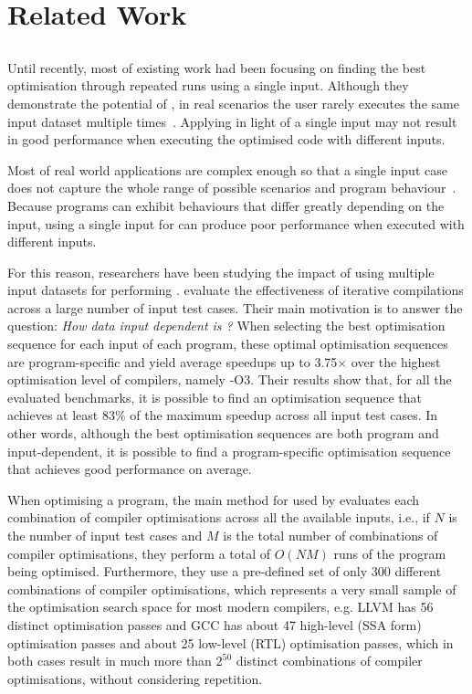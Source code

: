 \chapter{Related Work}

\section{{\IterComp}}

Until recently, most of existing work  had been focusing on finding the best optimisation through repeated runs using a single input.
Although they demonstrate the potential of {\itercomp}, in real scenarios the user rarely executes the same input dataset multiple times~\citep{bodin98,kisuki99,stephenson03,kulkarni04,agakov06}.
Applying {\itercomp} in light of a single input may not result in good performance when executing the optimised code with different inputs.

Most of real world applications are complex enough so that a single input case does not capture the whole range of possible scenarios and program behaviour~\citep{haneda06,fursin07,chen10,chen12a}.
Because programs can exhibit behaviours that differ greatly depending on the input, using a single input for {\itercomp} can produce poor performance when executed with different inputs.

For this reason, researchers have been studying the impact of using multiple input datasets for performing {\itercomp}.
\cite{chen10,chen12a} evaluate the effectiveness of iterative compilations across a large number of input test cases.
Their main motivation is to answer the question:
\textit{How data input dependent is {\itercomp}?}
When selecting the best optimisation sequence for each input of each program, these optimal optimisation sequences are program-specific and yield average speedups up to 3.75$\times$ over the highest optimisation level of compilers, namely {\flagstype -O3}.
Their results show that, for all the evaluated benchmarks, it is possible to find an optimisation sequence that achieves at least 83\% of the maximum speedup across all input test cases.
In other words, although the best optimisation sequences are both program and input-dependent, it is possible to find a program-specific optimisation sequence that achieves good performance on average.

When optimising a program, the main method for {\itercomp} used by \cite{chen10,chen12a} evaluates each combination of compiler optimisations across all the available inputs, i.e., if $N$ is the number of input test cases and $M$ is the total number of combinations of compiler optimisations, they perform a total of $O(NM)$ runs of the program being optimised.
Furthermore, they use a pre-defined set of only 300 different combinations of compiler optimisations, which represents a very small sample of the optimisation search space for most modern compilers, e.g.
LLVM has 56 distinct optimisation passes and GCC has about 47 high-level (SSA form) optimisation passes and about 25 low-level (RTL) optimisation passes, which in both cases result in much more than $2^{50}$ distinct combinations of compiler optimisations, without considering repetition.


